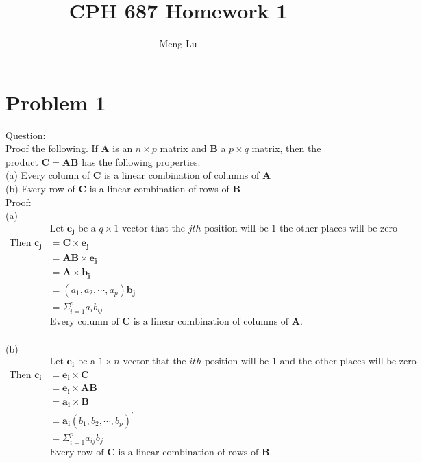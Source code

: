 \documentclass{article}
\begin{document}
 



\title{CPH 687 Homework 1}
\author{\small{Meng Lu}}
\maketitle

\section{Problem 1}
Question:\\
Proof the following. If $\bm{A}$ is an $n\times p$ matrix and $\bm{B}$
a $p\times q$ matrix, then the product $\bm{C}=\bm{AB}$ has the
following properties:\\
(a) Every column of $\bm{C}$ is a linear combination of columns of $\bm{A}$\\
(b) Every row of $\bm{C}$ is a linear combination of rows of $\bm{B}$\\
Proof:\\
(a)\\
\begin{align*}
  &\text{Let }\bm{e_j}\text{ be a }q\times 1 \text{ vector that the
  }jth\text{ position will be 1 the other places will be zero}\\
  \text{Then }\bm{c_j}&=\bm{C}\times \bm{e_j}\\
  &=\bm{AB}\times \bm{e_j}\\
  &=\bm{A}\times \bm{b_j}\\
  &=(a_1,a_2, \cdots, a_p)\bm{b_j}\\
  &=\Sigma_{i=1}^{p}a_ib_{ij}\\
  &\text{Every column of }\bm{C}\text{ is a linear combination of
    columns of }\bm{A}
  .
  \end{align*}\\
(b)\\
\begin{align*}
 &\text{Let }\bm{e_i}\text{ be a }1\times n \text{ vector that the }ith
 \text{ position will be 1 and the other places will be zero}\\
 \text{Then }\bm{c_i}&=\bm{e_i}\times \bm{C}\\
 &=\bm{e_i}\times \bm{AB}\\
 &=\bm{a_i}\times \bm{B}\\
 &=\bm{a_i}(b_1,b_2, \cdots, b_p)^{\prime}\\
 &=\Sigma_{i=1}^{p}a_{ij}b_j\\
 &\text{Every row of }\bm{C} \text{ is a linear combination of rows of
 }\bm{B}
 .
 \end{align*}
 
\end{document}
